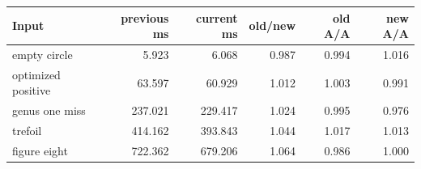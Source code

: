 \begin{center}
\small
\begin{tabular}{lrrrrr}
\toprule
Input & previous ms & current ms & old/new & old A/A & new A/A\\
\midrule
empty circle & 5.923 & 6.068 & 0.987 & 0.994 & 1.016\\
optimized positive & 63.597 & 60.929 & 1.012 & 1.003 & 0.991\\
genus one miss & 237.021 & 229.417 & 1.024 & 0.995 & 0.976\\
trefoil & 414.162 & 393.843 & 1.044 & 1.017 & 1.013\\
figure eight & 722.362 & 679.206 & 1.064 & 0.986 & 1.000\\
\bottomrule
\end{tabular}
\end{center}
